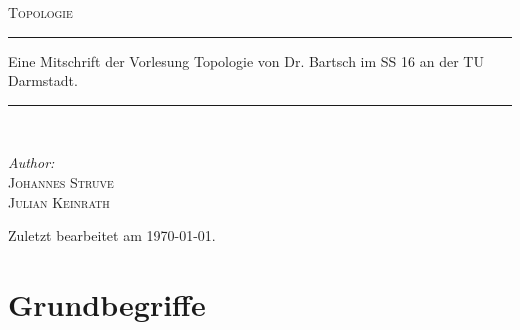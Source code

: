 \documentclass[a4paper,12pt,fleqn]{scrartcl}
\theoremstyle{definition}
\theoremstyle{plain}
\theoremstyle{remark}
\begin{document}
\begin{titlepage}
\begin{center}
\textsc{\LARGE Topologie}\\[2.0cm]
\rule{\linewidth}{0.5mm}
Eine Mitschrift der Vorlesung Topologie von Dr. Bartsch im SS 16 an der TU Darmstadt.
\rule{\linewidth}{0.5mm}\\[2.0cm]
\begin{minipage}{0.4\textwidth}
\begin{flushleft}
\large \emph{Author:}\\\textsc{Johannes Struve\\Julian Keinrath}\\[1.0cm]
\end{flushleft}
\end{minipage}
\vfill
Zuletzt bearbeitet am {\large \today}.
\end{center}
\end{titlepage}

\tableofcontents

\newpage

\section{Grundbegriffe}
\end{document}
